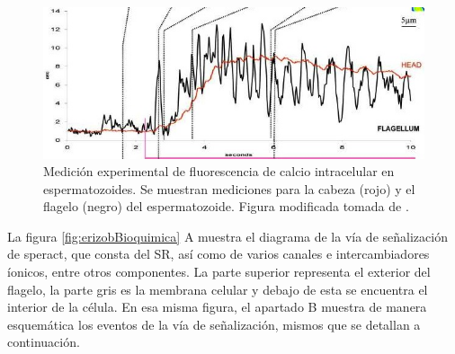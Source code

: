 \begin{figure}[hbt]
\includegraphics[width=0.9\linewidth]{gfx/maderaSperact}
\caption[Medición experimental de calcio intracelular]{Medición experimental de fluorescencia de calcio intracelular en espermatozoides. Se muestran mediciones para la cabeza (rojo) y el flagelo (negro) del espermatozoide. %
Figura modificada tomada de \citeauthor{Wood:2003p4517} \citep{Wood:2003p4517}.}\label{fig:fluorescencia}
\end{figure}

La figura \ref{fig:erizobBioquimica} \textsc{A} muestra el diagrama de la vía de señalización de speract, que consta del \ac{SR}, así como de varios canales e intercambiadores íonicos, entre otros componentes. La parte superior representa el exterior del flagelo, la parte gris es la membrana celular y debajo de esta se encuentra el interior de la célula. En esa misma figura, el apartado \textsc{B} muestra de manera esquemática los eventos de la vía de señalización, mismos que se detallan a continuación.

